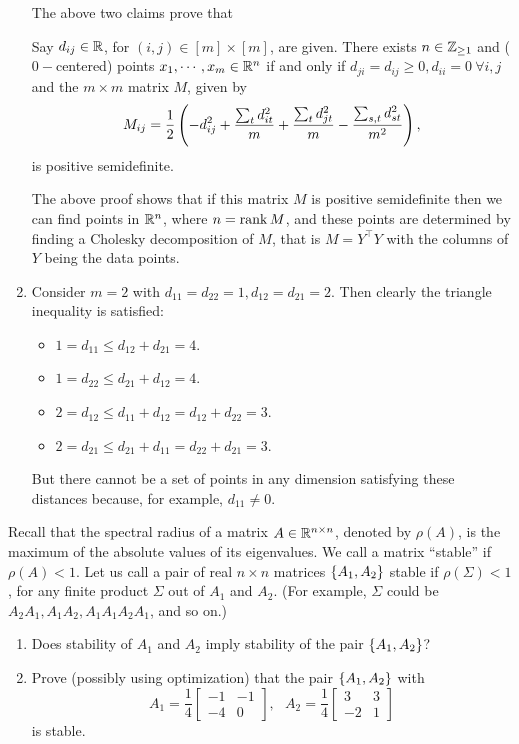 \begin{enumerate}[leftmargin=*]
The above two claims prove that \begin{thm}
Say $d_{ij}\in\mathbb{R}$, for $(i,j)\in [m]\times [m]$, are given. There exists $n\in\mathbb{Z}_{\ge1}$ and ($0-$centered) points $x_{1},\cdots,x_{m}\in\mathbb{R}^{n}$ if and only if $d_{ji} = d_{ij}\ge0, d_{ii}=0~\forall i,j$ and the $m\times m$ matrix $M$, given by $$\displaystyle M_{ij} = \frac{1}{2}\left(-d_{ij}^{2} + \frac{\sum_{t}d_{it}^{2}}{m} + \frac{\sum_{t}d_{jt}^{2}}{m} - \frac{\sum_{s,t}d_{st}^{2}}{m^{2}}\right),$$ is positive semidefinite. 
\end{thm}


The above proof shows that if this matrix $M$ is positive semidefinite then we can find points in $\mathbb{R}^{n}$, where $n=\operatorname{rank} M$, and these points are determined by finding a Cholesky decomposition of $M$, that is $M=Y^{\top}Y$ with the columns of $Y$ being the data points.

\item Consider $m=2$ with $d_{11}=d_{22} = 1, d_{12} = d_{21} = 2$. Then clearly the triangle inequality is satisfied:
\begin{itemize}
\item $1 = d_{11} \le d_{12} + d_{21} = 4$.
\item $1 = d_{22} \le d_{21} + d_{12} = 4$.
\item $2 = d_{12} \le d_{11} + d_{12} = d_{12} + d_{22} = 3$.
\item $2 = d_{21} \le d_{21} + d_{11} = d_{22} + d_{21} = 3$.
\end{itemize}
But there cannot be a set of points in any dimension satisfying these distances because, for example, $d_{11}\ne 0$.
\end{enumerate}

\newpage
\pb
Recall that the spectral radius of a matrix $A \in \mathbb{R}^{n\times n}$, denoted by $\rho(A)$, is the maximum of the absolute values of its eigenvalues. We call a matrix ``stable'' if $\rho(A) < 1$. Let us call a pair of real $n \times n$ matrices $\left\{A_{1}, A_{2}\right\}$ stable if $\rho(\Sigma) < 1$, for any finite product $\Sigma$ out of $A_{1}$ and $A_{2}$. (For example, $\Sigma$ could be $A_{2}A_{1}, A_{1}A_{2}, A_{1}A_{1}A_{2}A_{1}$, and so on.)

\begin{enumerate}[leftmargin=*]
\item Does stability of $A_{1}$ and $A_{2}$ imply stability of the pair $\left\{A_{1},A_{2}\right\}$?
\item Prove (possibly using optimization) that the pair $\left\{A_{1},A_{2}\right\}$ with $$A_{1} = \frac{1}{4}\begin{bmatrix}-1&-1\\-4&0\end{bmatrix}, ~~~A_{2} = \frac{1}{4}\begin{bmatrix}3&3\\-2&1\end{bmatrix}$$ is stable.
\end{enumerate}
\soln

